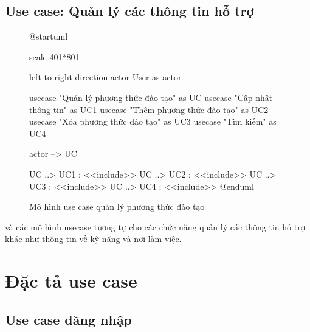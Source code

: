 \documentclass[report.tex]{subfiles}
\begin{document}
\subsection{Use case: Quản lý các thông tin hỗ trợ}

\begin{figure}[!htb]
\caption{Mô hình use case quản lý phương thức đào tạo}
\begin{plantuml}

@startuml

scale 401*801

left to right direction
actor User as actor

usecase "Quản lý phương thức đào tạo" as UC
usecase "Cập nhật thông tin" as UC1
usecase "Thêm phương thức đào tạo" as UC2
usecase "Xóa phương thức đào tạo" as UC3
usecase "Tìm kiếm" as UC4

actor --> UC

UC ..> UC1 : <<include>>
UC ..> UC2 : <<include>>
UC ..> UC3 : <<include>>
UC ..> UC4 : <<include>>
@enduml
\end{plantuml}
\end{figure}
\FloatBarrier

và các mô hình usecase tương tự cho các chức năng quản lý các thông tin hỗ trợ khác như
thông tin về kỹ năng và nơi làm việc.

\section{Đặc tả use case}

\subsection{Use case đăng nhập}

\end{document}
